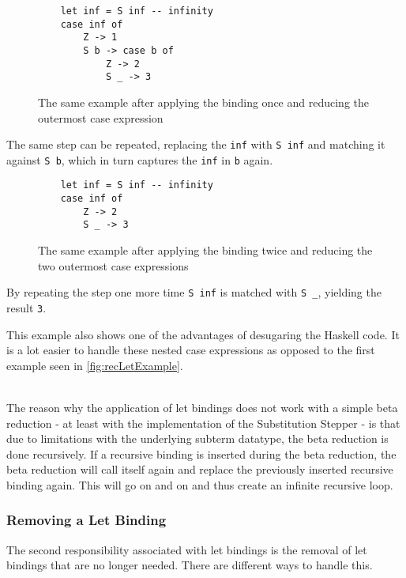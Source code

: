 \begin{figure}[!ht]
\begin{verbatim}
    let inf = S inf -- infinity
    case inf of
        Z -> 1
        S b -> case b of
            Z -> 2
            S _ -> 3
\end{verbatim}
    \caption{The same example after applying the binding once and reducing the outermost case expression}
    \label{fig:recLetExampleDesugared1}
\end{figure}

The same step can be repeated,
replacing the \texttt{inf} with \texttt{S inf} and matching it against \texttt{S b},
which in turn captures the \texttt{inf} in \texttt{b} again.

\begin{figure}[!ht]
\begin{verbatim}
    let inf = S inf -- infinity
    case inf of
        Z -> 2
        S _ -> 3
\end{verbatim}
    \caption{The same example after applying the binding twice and reducing the two outermost case expressions}
    \label{fig:recLetExampleDesugared2}
\end{figure}

By repeating the step one more time \texttt{S inf} is matched with \texttt{S \_},
yielding the result \texttt{3}.

This example also shows one of the advantages of desugaring the Haskell code.
It is a lot easier to handle these nested case expressions as opposed to the first example seen in \ref*{fig:recLetExample}.

\ \\
The reason why the application of let bindings does not work with a simple beta reduction
- at least with the implementation of the Substitution Stepper -
is that due to limitations with the underlying subterm datatype,
the beta reduction is done recursively.
If a recursive binding is inserted during the beta reduction,
the beta reduction will call itself again and replace the previously inserted recursive binding again.
This will go on and on and thus create an infinite recursive loop.

\subsubsection*{Removing a Let Binding}
The second responsibility associated with let bindings is the removal of let bindings that are no longer needed.
There are different ways to handle this.

